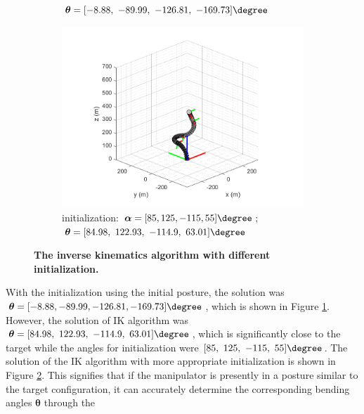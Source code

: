 \begin{figure}[H]
\begin{subfigure}{0.49\textwidth}
{        $\boldsymbol{\theta} = [-8.88,\ -89.99,\ -126.81,\ -169.73]\degree$ }
        \label{fig:complex_init_0_0_0_0}
    \end{subfigure}
    \begin{subfigure}{0.49\textwidth} %
        \centering
        \includegraphics[width=\linewidth]{Image/MATLAB/manipulator_84.98_122.93_-114.9_63.01.png}
        \caption{\centering initialization: $\boldsymbol{\alpha} = [85, 125, -115, 55]\degree$; \\
        $\boldsymbol{\theta} = [84.98,\ 122.93,\ -114.9,\ 63.01]\degree$ }
        \label{fig:complex_init_85_125_-115_55}
    \end{subfigure}
    \caption[The kinematics model of manipulator with respective bending modules]
    {\centering \textbf{The inverse kinematics algorithm with different initialization.}}
    \label{fig:80_120_-120_90_diff_initial}
\end{figure}
\noindent With the initialization using the initial posture, the solution was 
$\boldsymbol{\theta} = [-8.88, -89.99, -126.81, -169.73]\degree$, which is shown in Figure \ref{fig:complex_init_0_0_0_0}. 
However, the solution of IK algorithm was $\boldsymbol{\theta} = [84.98,\ 122.93,\ -114.9,\ 63.01]\degree$, 
which is significantly close to the target while the angles for initialization were $[85,\ 125,\ -115,\ 55]\degree$. 
The solution of the IK algorithm with more appropriate initialization is shown in Figure 
\ref{fig:complex_init_85_125_-115_55}. This signifies that if the manipulator is presently in a posture similar 
to the target configuration, it can accurately determine the corresponding bending angles $\boldsymbol{\theta}$ through the 

